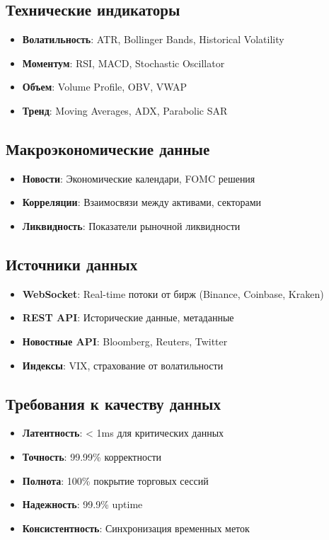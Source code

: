\documentclass[12pt,a4paper]{article}
\begin{document}
\subsection{Технические индикаторы}
\begin{itemize}
    \item \textbf{Волатильность}: ATR, Bollinger Bands, Historical Volatility
    \item \textbf{Моментум}: RSI, MACD, Stochastic Oscillator
    \item \textbf{Объем}: Volume Profile, OBV, VWAP
    \item \textbf{Тренд}: Moving Averages, ADX, Parabolic SAR
\end{itemize}

\subsection{Макроэкономические данные}
\begin{itemize}
    \item \textbf{Новости}: Экономические календари, FOMC решения
    \item \textbf{Корреляции}: Взаимосвязи между активами, секторами
    \item \textbf{Ликвидность}: Показатели рыночной ликвидности
\end{itemize}

\subsection{Источники данных}
\begin{itemize}
    \item \textbf{WebSocket}: Real-time потоки от бирж (Binance, Coinbase, Kraken)
    \item \textbf{REST API}: Исторические данные, метаданные
    \item \textbf{Новостные API}: Bloomberg, Reuters, Twitter
    \item \textbf{Индексы}: VIX, страхование от волатильности
\end{itemize}

\subsection{Требования к качеству данных}
\begin{itemize}
    \item \textbf{Латентность}: < 1ms для критических данных
    \item \textbf{Точность}: 99.99\% корректности
    \item \textbf{Полнота}: 100\% покрытие торговых сессий
    \item \textbf{Надежность}: 99.9\% uptime
    \item \textbf{Консистентность}: Синхронизация временных меток
\end{itemize}
\end{document}
